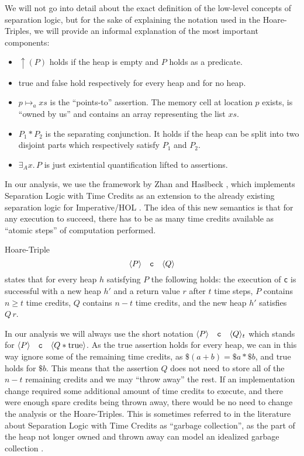 \documentclass[headsepline,footsepline,footinclude=false,oneside,fontsize=11pt,paper=a4,listof=totoc,bibliography=totoc]{scrbook} %
\begin{document}
We will not go into detail about the exact definition of the low-level concepts of separation logic, but for the sake of explaining the notation used in the Hoare-Triples, we will provide an informal explanation of the most important components:
\begin{itemize}
	\item $\uparrow(P)$ holds if the heap is empty and $P$ holds as a predicate.
	\item true and false hold respectively for every heap and for no heap.
	\item $p \mapsto_a xs$ is the ``points-to'' assertion. The memory cell at location $p$ exists, is ``owned by us'' and contains an array representing the list $xs$.
	\item $P_1 * P_2$ is the separating conjunction. It holds if the heap can be split into two disjoint parts which respectively satisfy $P_1$ and $P_2$.
	\item $\exists_A x.\, P$ is just existential quantification lifted to assertions.
\end{itemize}


In our analysis, we use the framework by Zhan and Haslbeck \cite{ZhanHasl18}, which implements Separation Logic with Time Credits as an extension to the already existing separation logic for Imperative/HOL \cite{Bulwahn08}. The idea of this new semantics is that for any execution to succeed, there has to be as many time credits available as ``atomic steps'' of computation performed. 

\begin{definition}{Hoare-Triple}
	\begin{equation}
		\langle P \rangle \quad \verb|c| \quad \langle Q \rangle
	\end{equation}
	states that for every heap $h$ satisfying $P$ the following holds: the execution of \verb|c| is successful with a new heap $h'$ and a return value $r$ after $t$ time steps, $P$ contains $n \geq t$ time credits, $Q$ contains $n-t$ time credits, and the new heap $h'$ satisfies $Q\, r$.
\end{definition}

In our analysis we will always use the short notation $\langle P \rangle \quad \verb|c|\quad \langle Q \rangle_t$ which stands for $\langle P \rangle \quad \verb|c|\quad \langle Q * \mathrm{true} \rangle$. As the $\mathrm{true}$ assertion holds for every heap, we can in this way ignore some of the remaining time credits, as $\$(a + b) = \$a * \$b$, and $\mathrm{true}$ holds for $\$b$. This means that the assertion $Q$ does not need to store all of the $n - t$ remaining credits and we may ``throw away'' the rest. If an implementation change required some additional amount of time credits to execute, and there were enough spare credits being thrown away, there would be no need to change the analysis or the Hoare-Triples. This is sometimes referred to in the literature about Separation Logic with Time Credits as ``garbage collection'', as the part of the heap not longer owned and thrown away can model an idealized garbage collection \cite{chargueraud17}.
\end{document}
